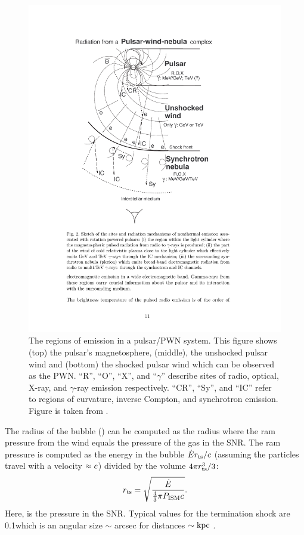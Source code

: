 \begin{figure}[htbp]
  \centering
    \includegraphics{chapters/pulsar_pwn_system/figures/termination_shock.pdf}
  \caption{The regions of emission in a pulsar/\ac{PWN} system. 
  This figure shows (top) the pulsar's magnetosphere, (middle), the
  unshocked pulsar wind and (bottom) the shocked pulsar wind which can
  be observed as the \ac{PWN}.
  ``R'', ``O'', ``X'', and ``$\gamma$'' describe sites of radio, optical, X-ray, and
  $\gamma$-ray emission respectively.
  ``CR'', ``Sy'', and ``IC'' refer to regions of curvature, inverse Compton, and
  synchrotron emission.
  Figure is taken from \cite{aharonian_2003_exploring-physics}.
  }
\end{figure}

The radius of the bubble (\radiusterminationshock) can be computed as the
radius where the ram pressure from the wind equals the pressure of the
gas in the \ac{SNR}.  The ram pressure is computed as the energy in the
bubble $\dot{E} r_\text{ts}/c$ (assuming the particles
travel with a velocity $\approx c$) divided by the volume
$4\pi r_\text{ts}^3/3$: \begin{equation}
  r_\text{ts} = \sqrt{\frac{\dot{E}}{\tfrac{4}{3}\pi P_\text{ISM} c}}.
\end{equation}
Here, \pressureISM is the pressure in the SNR.  Typical values
for the termination shock are 0.1\unitspace\parsec which is an
angular size $\sim$ \ac{arcsec} for distances $\sim\text{k}\text{pc}$
\citep{gaensler_2006_evolution-structure}.


